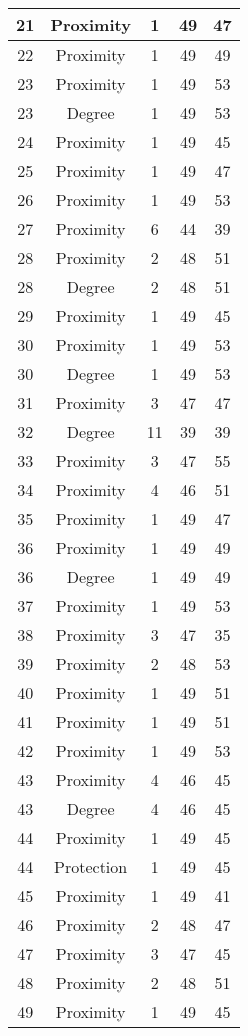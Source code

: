 \documentclass[results.tex]{subfiles}
\begin{document}
\begin{center}
\begin{tabular}{| c || c | c | c | c |}
    \hline
    21 & Proximity & 1 & 49 & 47 \\ 
    \hline
    22 & Proximity & 1 & 49 & 49 \\ 
    \hline
    23 & Proximity & 1 & 49 & 53 \\ 
    \hline
    23 & Degree & 1 & 49 & 53 \\ 
    \hline
    24 & Proximity & 1 & 49 & 45 \\ 
    \hline
    25 & Proximity & 1 & 49 & 47 \\ 
    \hline
    26 & Proximity & 1 & 49 & 53 \\ 
    \hline
    27 & Proximity & 6 & 44 & 39 \\ 
    \hline
    28 & Proximity & 2 & 48 & 51 \\ 
    \hline
    28 & Degree & 2 & 48 & 51 \\ 
    \hline
    29 & Proximity & 1 & 49 & 45 \\ 
    \hline
    30 & Proximity & 1 & 49 & 53 \\ 
    \hline
    30 & Degree & 1 & 49 & 53 \\ 
    \hline
    31 & Proximity & 3 & 47 & 47 \\ 
    \hline
    32 & Degree & 11 & 39 & 39 \\ 
    \hline
    33 & Proximity & 3 & 47 & 55 \\ 
    \hline
    34 & Proximity & 4 & 46 & 51 \\ 
    \hline
    35 & Proximity & 1 & 49 & 47 \\ 
    \hline
    36 & Proximity & 1 & 49 & 49 \\ 
    \hline
    36 & Degree & 1 & 49 & 49 \\ 
    \hline
    37 & Proximity & 1 & 49 & 53 \\ 
    \hline
    38 & Proximity & 3 & 47 & 35 \\ 
    \hline
    39 & Proximity & 2 & 48 & 53 \\ 
    \hline
    40 & Proximity & 1 & 49 & 51 \\ 
    \hline
    41 & Proximity & 1 & 49 & 51 \\ 
    \hline
    42 & Proximity & 1 & 49 & 53 \\ 
    \hline
    43 & Proximity & 4 & 46 & 45 \\ 
    \hline
    43 & Degree & 4 & 46 & 45 \\ 
    \hline
    44 & Proximity & 1 & 49 & 45 \\ 
    \hline
    44 & Protection & 1 & 49 & 45 \\ 
    \hline
    45 & Proximity & 1 & 49 & 41 \\ 
    \hline
    46 & Proximity & 2 & 48 & 47 \\ 
    \hline
    47 & Proximity & 3 & 47 & 45 \\ 
    \hline
    48 & Proximity & 2 & 48 & 51 \\ 
    \hline
    49 & Proximity & 1 & 49 & 45 \\ 
    \hline   \end{tabular}
\end{center}
\end{document}
